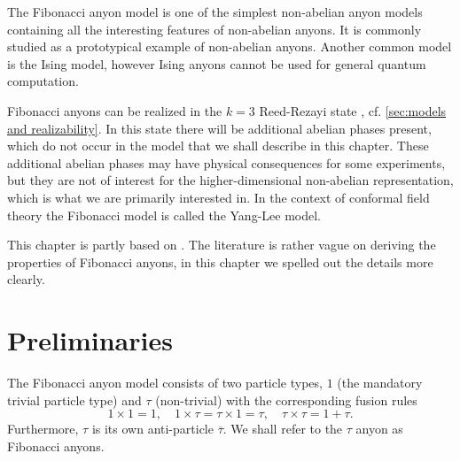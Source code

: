 \documentclass[a4paper,10pt,oneside]{book}
\theoremstyle{plain}
\theoremstyle{definition}
\theoremstyle{remark}
\begin{document}
The Fibonacci anyon model is one of the simplest non-abelian anyon models containing all the interesting features of non-abelian anyons. It is commonly studied as a prototypical example of non-abelian anyons. Another common model is the Ising model, however Ising anyons cannot be used for general quantum computation.

Fibonacci anyons can be realized in the $k=3$ Reed-Rezayi state \cite{topological quantum compiling}, cf. \cref{sec:models and realizability}. In this state there will be additional abelian phases present, which do not occur in the model that we shall describe in this chapter. These additional abelian phases may have physical consequences for some experiments, but they are not of interest for the higher-dimensional non-abelian representation, which is what we are primarily interested in. In the context of conformal field theory the Fibonacci model is called the Yang-Lee model.

This chapter is partly based on \cite{preskill,topological quantum compiling,short intro fib}. The literature is rather vague on deriving the properties of Fibonacci anyons, in this chapter we spelled out the details more clearly.

\section{Preliminaries}\label{sec:fibonacci preliminaries}

The Fibonacci anyon model consists of two particle types, $1$ (the mandatory trivial particle type) and $τ$ (non-trivial) with the corresponding fusion rules
\begin{equation}
  1 \times 1 = 1, \quad
  1 \times τ = τ \times 1 = τ, \quad
  τ \times τ = 1 + τ.
\end{equation}
Furthermore, $\tau$ is its own anti-particle $\overline{τ}$. We shall refer to the $τ$ anyon as Fibonacci anyons.
\end{document}
